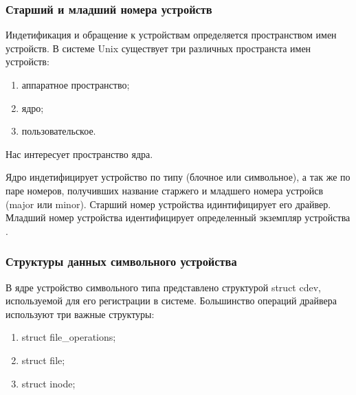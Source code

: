 \subsubsection{Старший и младший номера устройств}
Индетификация и обращение к устройствам определяется пространством имен устройств.
В системе Unix существует три различных пространста имен устройств:
\begin{enumerate}
	\item аппаратное пространство;
	\item ядро;
	\item пользовательское.
\end{enumerate}
Нас интересует пространство ядра.

Ядро индетифицирует устройство по типу (блочное или символьное), а так же по паре номеров, получивших название старжего и младшего номера устройсв (major или minor).
Старший номер устройства идинтифицирует его драйвер. 
Младший номер устройства идентифицирует определенный экземпляр устройства \cite{5}.

\subsubsection{Структуры данных символьного устройства}
В ядре устройство символьного типа представлено структурой struct cdev, используемой для его регистрации в системе.
Большинство операций драйвера используют три важные структуры:
\begin{enumerate}
	\item struct file\_operations;
	\item struct file;
	\item struct inode;
\end{enumerate}

